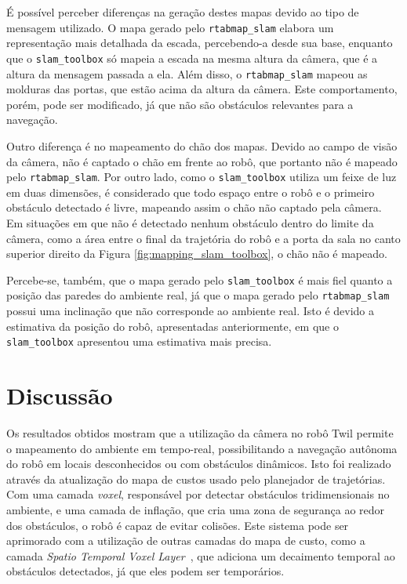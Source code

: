 \documentclass[repeatfields,xlists,xpacks,oneside,yearsonly]{ufrgscca}
\begin{document}
É possível perceber diferenças na geração destes mapas devido ao tipo de mensagem
utilizado. O mapa gerado pelo \texttt{rtabmap\_slam} elabora um representação mais
detalhada da escada, percebendo-a desde sua base, enquanto que o \texttt{slam\_toolbox}
só mapeia a escada na mesma altura da câmera, que é a altura da mensagem passada
a ela.
Além disso, o \texttt{rtabmap\_slam} mapeou as molduras das portas, que estão acima
da altura da câmera. Este comportamento, porém, pode ser modificado, já que
não são obstáculos relevantes para a navegação.

Outro diferença é no mapeamento do chão dos mapas. Devido ao campo de
visão da câmera, não é captado o chão em frente ao robô, que portanto
não é mapeado pelo \texttt{rtabmap\_slam}. Por outro lado, como o
\texttt{slam\_toolbox} utiliza um feixe de luz em duas dimensões, é
considerado que todo espaço entre o robô e o primeiro obstáculo
detectado é livre, mapeando assim o chão não captado pela câmera. Em
situações em que não é detectado nenhum obstáculo dentro do limite da
câmera, como a área entre o final da trajetória do robô e a porta da
sala no canto superior direito da Figura
\ref{fig:mapping_slam_toolbox}, o chão não é mapeado.

Percebe-se, também, que o mapa gerado pelo \texttt{slam\_toolbox} é
mais fiel quanto a posição das paredes do ambiente real, já que o
mapa gerado pelo \texttt{rtabmap\_slam} possui uma inclinação que não
corresponde ao ambiente real. Isto é devido a estimativa da posição
do robô, apresentadas anteriormente, em que o \texttt{slam\_toolbox}
apresentou uma estimativa mais precisa.

\chapter{Discussão}
\label{discussao}

Os resultados obtidos mostram que a utilização da câmera no robô Twil
permite o mapeamento do ambiente em tempo-real, possibilitando a
navegação autônoma do robô em locais desconhecidos ou com obstáculos
dinâmicos. Isto foi realizado através da atualização do mapa de
custos usado pelo planejador de trajetórias. Com uma camada
\textit{voxel}, responsável por detectar obstáculos tridimensionais
no ambiente, e uma camada de inflação, que cria uma zona de segurança
ao redor dos obstáculos, o robô é capaz de evitar colisões. Este
sistema pode ser aprimorado com a utilização de outras camadas do
mapa de custo, como a camada \textit{Spatio Temporal Voxel
    Layer}~\cite{stlv_article}, que adiciona um decaimento temporal ao
obstáculos detectados, já que eles podem ser temporários.
\end{document}
